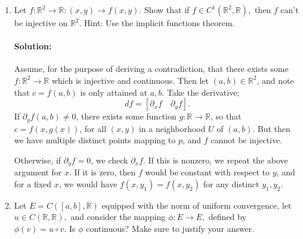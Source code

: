 \documentclass{article}
\begin{document}
\begin{enumerate}
\item  Let $f:\mathbb{R}^2\to\mathbb{R}:(x,y)\to f(x,y).$ Show that if $f\in C^1(\mathbb{R}^2,\mathbb{R}),$ then $f$ can't be injective on $\mathbb{R}^2.$ Hint: Use the implicit functions theorem.
    \paragraph{Solution: } Assume, for the purpose of deriving a contradiction, that there exists some $f:\mathbb{R}^2\to \mathbb{R}$ which is injective and continuous. Then let $(a,b)\in \mathbb{R}^2$, and note that $c=f(a,b)$ is only attained at $a,b$. Take the derivative; 
    \[
        df=[\partial_x f\quad \partial_y f]
    .\] 
    If $\partial_yf(a,b)\neq 0$, there exists some function $g:\mathbb{R}\to \mathbb{R}$, so that $c=f(x,g(x))$, for all $(x,y)$ in a neighborhood $U$ of $(a,b)$. But then we have multiple distinct points mapping to $p$, and $f$ cannot be injective.

    Otherwise, if $\partial_yf=0$, we check $\partial_xf$. If this is nonzero, we repeat the above argument for $x$. 
    If it is zero, then $f$ would be constant with respect to $y$, and for a fixed $x$, we would have $f(x,y_1)=f(x,y_2)$ for any distinct $y_1,y_2$. %

\item  Let $E=C([a,b],\mathbb{R})$ equipped with the norm of uniform convergence, let $u\in C(\mathbb{R},\mathbb{R}),$ and consider the mapping $\phi:E\to E,$ defined by $\phi(v)=u\circ v.$ Is $\phi$ continuous? Make sure to justify your answer.

\end{enumerate}
\end{document}
